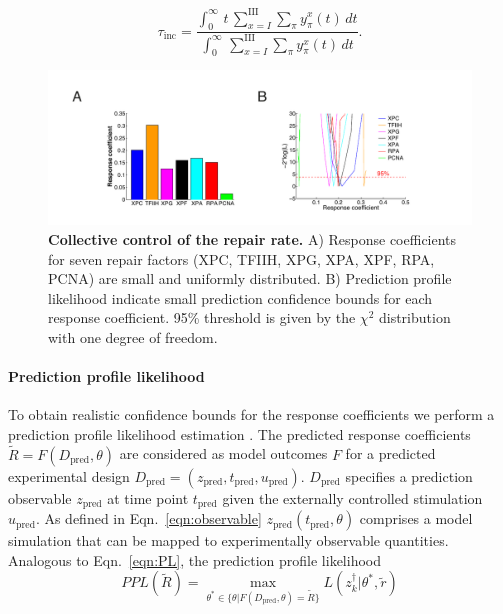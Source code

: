 \begin{equation}
\tau_{\text{inc}}=\frac{\int^\infty_0 \,t \,\sum_{x=I}^{\text{III}} \sum_ \pi  y_\pi^x(t)\,dt}{\int^\infty_0  \,\sum_{x=I}^{\text{III}} \sum_ \pi  y_\pi^x(t)\,dt}.
\end{equation}    



\begin{figure}[htbp]
	\begin{center}
		\includegraphics[width=1\textwidth]{Abbildungen/figure3_1.pdf}
		\caption{\textbf{Collective control of the repair rate.} A) Response coefficients for seven repair factors (XPC, TFIIH, XPG, XPA, XPF, RPA, PCNA) are small and uniformly distributed. B) Prediction profile likelihood indicate small prediction confidence bounds for each response coefficient. 95\% threshold is given by the $\chi^{2}$ distribution with one degree of freedom.}
		\label{fig:controlCoefficients}
	\end{center}
\end{figure}

\paragraph{Prediction profile likelihood}
To obtain realistic confidence bounds for the response coefficients we perform a prediction profile likelihood estimation \cite{Kreutz2012,Hinkley1979}. The predicted response coefficients $\tilde{R} = F(D_{\text{pred}},\theta)$ are considered as model outcomes $F$ for a predicted experimental design $D_{\text{pred}}= (z_{\text{pred}},t_{\text{pred}},u_{\text{pred}})$. $D_{\text{pred}}$ specifies a prediction observable $z_{\text{pred}}$ at time point $t_{\text{pred}}$ given the externally controlled stimulation $u_{\text{pred}}$. As defined in Eqn.\ \ref{eqn:observable} $z_{\text{pred}}(t_{\text{pred}},\theta)$ comprises a model simulation that can be mapped to experimentally observable quantities. Analogous to Eqn.\ \ref{eqn:PL}, the prediction profile likelihood 
\begin{equation}\label{sec:ppl}
PPL(\tilde{R}) = \max_{\theta^\ast \in \{\theta \lvert F(D_{\text{pred}},\theta)=\tilde{R}\}} L(z_k^\dag \lvert \theta^\ast,\tilde{r}) 
\end{equation}   

